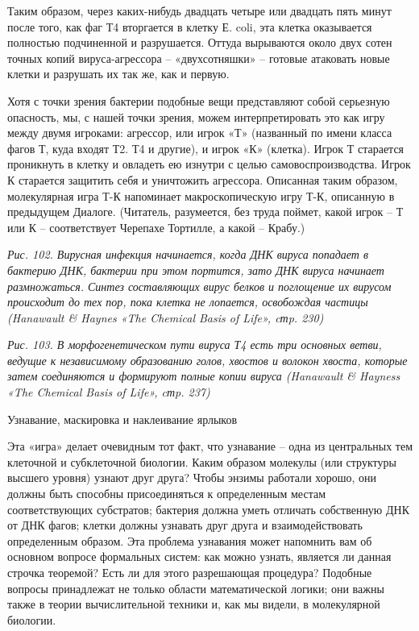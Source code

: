 \documentclass[../main.tex]{subfiles}
\begin{document}
Таким образом, через каких-нибудь двадцать четыре или двадцать пять минут после того, как фаг Т4 вторгается в клетку Е. coli, эта клетка оказывается полностью подчиненной и разрушается. Оттуда вырываются около двух сотен точных копий вируса-агрессора \--- «двухсотняшки» \--- готовые атаковать новые клетки и разрушать их так же, как и первую.

Хотя с точки зрения бактерии подобные вещи представляют собой серьезную опасность, мы, с нашей точки зрения, можем интерпретировать это как игру между двумя игроками: агрессор, или игрок «Т» (названный по имени класса фагов Т, куда входят Т2. Т4 и другие), и игрок «К» (клетка). Игрок Т старается проникнуть в клетку и овладеть ею изнутри с целью самовоспроизводства. Игрок К старается защитить себя и уничтожить агрессора. Описанная таким образом, молекулярная игра Т-К напоминает макроскопическую игру Т-К, описанную в предыдущем Диалоге. (Читатель, разумеется, без труда поймет, какой игрок \--- Т или К \--- соответствует Черепахе Тортилле, а какой \--- Крабу.)

\emph{Рис. 102. Вирусная инфекция начинается, когда ДНК вируса попадает в бактерию ДНК, бактерии при этом портится, зато ДНК вируса начинает размножаться. Синтез составляющих вирус белков и поглощение их вирусом происходит до тех пор, пока клетка не лопается, освобождая частицы (Hanawault \& Haynes «The Chemical Basis of Life», cтp. 230)}

\emph{Рис. 103. В морфогенетическом пути вируса Т4 есть три основных ветви, ведущие к независимому образованию голов, хвостов и волокон хвоста, которые затем соединяются и формируют полные копии вируса (Hanawault \& Hayness «The Chemical Basis of Life», cтp. 237)}

Узнавание, маскировка и наклеивание ярлыков

Эта «игра» делает очевидным тот факт, что узнавание \--- одна из центральных тем клеточной и субклеточной биологии. Каким образом молекулы (или структуры высшего уровня) узнают друг друга? Чтобы энзимы работали хорошо, они должны быть способны присоединяться к определенным местам соответствующих субстратов; бактерия должна уметь отличать собственную ДНК от ДНК фагов; клетки должны узнавать друг друга и взаимодействовать определенным образом. Эта проблема узнавания может напомнить вам об основном вопросе формальных систем: как можно узнать, является ли данная строчка теоремой? Есть ли для этого разрешающая процедура? Подобные вопросы принадлежат не только области математической логики; они важны также в теории вычислительной техники и, как мы видели, в молекулярной биологии.
\end{document}

